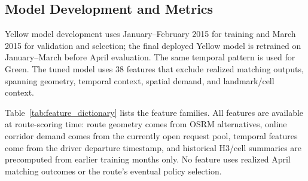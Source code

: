 \documentclass[journal]{IEEEtran}
\begin{document}
\subsection{Model Development and Metrics}
Yellow model development uses January--February 2015 for training and March 2015 for validation and selection; the final deployed Yellow model is retrained on January--March before April evaluation. The same temporal pattern is used for Green. The tuned model uses 38 features that exclude realized matching outputs, spanning geometry, temporal context, spatial demand, and landmark/cell context.

Table~\ref{tab:feature_dictionary} lists the feature families. All features are available at route-scoring time: route geometry comes from OSRM alternatives, online corridor demand comes from the currently open request pool, temporal features come from the driver departure timestamp, and historical H3/cell summaries are precomputed from earlier training months only. No feature uses realized April matching outcomes or the route's eventual policy selection.
\end{document}
